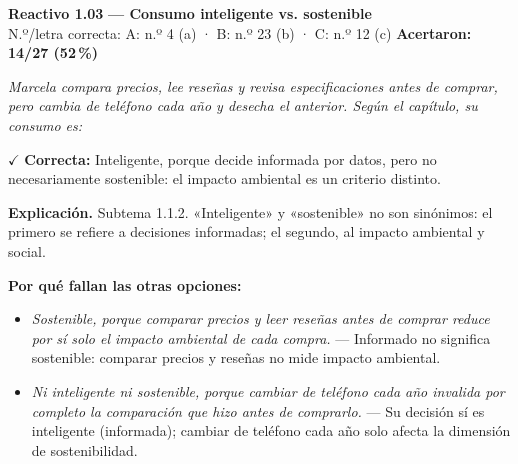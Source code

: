 \documentclass[10pt,letterpaper]{article}
\begin{document}
\begin{minipage}{\textwidth}
{\color{guinda}\textbf{Reactivo 1.03}} \textbf{— Consumo inteligente vs. sostenible}\\[-1pt]
{\scriptsize N.º/letra correcta: A: n.º 4 (a) · B: n.º 23 (b) · C: n.º 12 (c) \hfill \textbf{Acertaron: 14/27 (52\,\%)}}

\textit{Marcela compara precios, lee reseñas y revisa especificaciones antes de comprar, pero cambia de teléfono cada año y desecha el anterior. Según el capítulo, su consumo es:}

\textcolor{verde}{$\checkmark$} \textbf{Correcta:} Inteligente, porque decide informada por datos, pero no necesariamente sostenible: el impacto ambiental es un criterio distinto.

\textbf{Explicación.} Subtema 1.1.2. «Inteligente» y «sostenible» no son sinónimos: el primero se refiere a decisiones informadas; el segundo, al impacto ambiental y social.

\textbf{Por qué fallan las otras opciones:}
\begin{itemize}[itemsep=0pt,topsep=1pt,leftmargin=1.3em,parsep=0pt]
\item[\textcolor{rojo}{$\times$}] \textit{Sostenible, porque comparar precios y leer reseñas antes de comprar reduce por sí solo el impacto ambiental de cada compra.} --- Informado no significa sostenible: comparar precios y reseñas no mide impacto ambiental.
\item[\textcolor{rojo}{$\times$}] \textit{Ni inteligente ni sostenible, porque cambiar de teléfono cada año invalida por completo la comparación que hizo antes de comprarlo.} --- Su decisión sí es inteligente (informada); cambiar de teléfono cada año solo afecta la dimensión de sostenibilidad.
\end{itemize}
\end{minipage}\par\vspace{5pt}{\color{gray!40}\hrule}\vspace{5pt}
\end{document}
